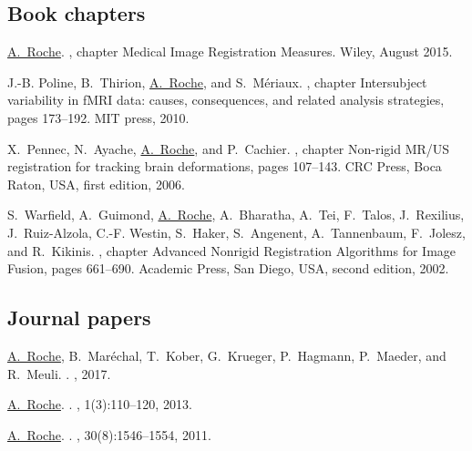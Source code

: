 \begin{thebibliography}{100}

\subsection*{Book chapters}

\underline{A.~Roche}.
, chapter {Medical Image
  Registration Measures}.
\newblock Wiley, August 2015.

J.-B. Poline, B.~Thirion, \underline{A.~Roche}, and S.~M\'eriaux.
, chapter
  {Intersubject variability in fMRI data: causes, consequences, and related
  analysis strategies}, pages 173--192.
\newblock MIT press, 2010.

X.~Pennec, N.~Ayache, \underline{A.~Roche}, and P.~Cachier.
, chapter
  Non-rigid {MR/US} registration for tracking brain deformations, pages
  107--143.
\newblock CRC Press, Boca Raton, USA, first edition, 2006.

S.~Warfield, A.~Guimond, \underline{A.~Roche}, A.~Bharatha, A.~Tei, F.~Talos, J.~Rexilius,
  J.~Ruiz-Alzola, C.-F. Westin, S.~Haker, S.~Angenent, A.~Tannenbaum,
  F.~Jolesz, and R.~Kikinis.
, chapter Advanced Nonrigid
  Registration Algorithms for Image Fusion, pages 661--690.
\newblock Academic Press, San Diego, USA, second edition, 2002.


\subsection*{Journal papers}

\underline{A.~Roche}, B.~Mar\'echal, T.~Kober, G.~Krueger, P.~Hagmann, P.~Maeder, and
  R.~Meuli.
.
,
  2017.

\underline{A.~Roche}.
.
,
  1(3):110--120, 2013.

\underline{A.~Roche}.
.
, 30(8):1546--1554, 2011.


\end{thebibliography}
